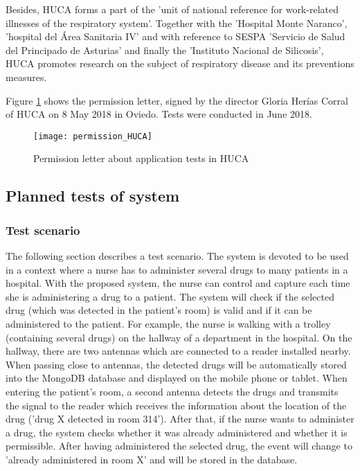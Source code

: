 Besides, HUCA forms a part of the 'unit of national reference for work-related illnesses of the respiratory system'. Together with the 'Hospital Monte Naranco', 'hospital del Área Sanitaria IV' and with reference to \ac{SESPA} 'Servicio de Salud del Principado de Asturias' and finally the 'Instituto Nacional de Silicosis', HUCA promotes research on the subject of respiratory disease and its preventions measures.

Figure \ref{fig:permission} shows the permission letter, signed by the director Gloria Herías Corral of HUCA on 8 May 2018 in Oviedo.
Tests were conducted in June 2018.

\begin{figure}
\centering
\texttt{[image: permission\_HUCA]} 
\caption{\label{fig:permission}Permission letter about application tests in HUCA} 
\end{figure}

\subsection{Planned tests of system}

\subsubsection{Test scenario}

The following section describes a test scenario. 
The system is devoted to be used in a context where a nurse has to administer several drugs to many patients in a hospital. With the proposed system, the nurse can control and capture each time she is administering a drug to a patient. The system will check if the selected drug (which was detected in the patient's room) is valid and if it can be administered to the patient. For example, the nurse is walking with a trolley (containing several drugs) on the hallway of a department in the hospital. On the hallway, there are two antennas which are connected to a reader installed nearby. When passing close to antennas, the detected drugs will be automatically stored into the MongoDB database and displayed on the mobile phone or tablet. 
When entering the patient's room, a second antenna detects the drugs and transmits the signal to the reader which receives the information about the location of the drug ('drug X detected in room 314'). After that, if the nurse wants to administer a drug, the system checks whether it was already administered and whether it is permissible. After having administered the selected drug, the event will change to 'already administered in room X' and will be stored in the database. 

